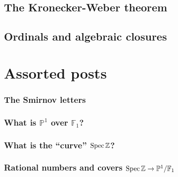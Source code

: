 \documentclass[a4paper]{memoir}
\begin{document}
\chapter{The Kronecker-Weber theorem}




\chapter{Ordinals and algebraic closures}





\part{Assorted posts}

\setcounter{section}{0}
\renewcommand\leftmark{ASSORTED POSTS}
\renewcommand\thesection{\Alph{section}}

\section{The Smirnov letters}

\let\stdsection\section  
\renewcommand\section{\newpage\stdsection} 

\section{What is \texorpdfstring{$\mathbb{P}^1$}{the projective line} over \texorpdfstring{$\mathbb{F}_1$}{F\_un}?}


\section{What is the ``curve'' \texorpdfstring{$\operatorname{Spec}\mathbb{Z}$}{Spec Z}?}


\section{Rational numbers and covers \texorpdfstring{$\operatorname{Spec}\mathbb{Z}\to\mathbb{P}^1/\mathbb{F}_1$}{}}

\end{document}
